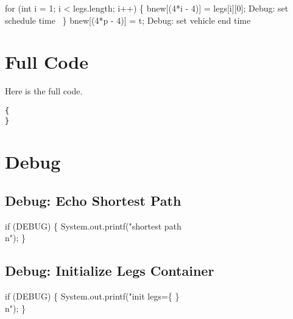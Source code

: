 \nwenddocs{}\endmoddef\nwstartdeflinemarkup{}\nwenddeflinemarkup
for (int i = 1; i < legs.length; i++) \{
  bnew[(4*i - 4)] = legs[i][0];
  \LA{}Debug: set schedule time~{\nwtagstyle{}}\RA{}
\}
bnew[(4*p - 4)] = t;
\LA{}Debug: set vehicle end time~{\nwtagstyle{}}\RA{}
\nwendcode{}\nwdocspar

\section{Full Code}

Here is the full code.

\begin{verbatim}
{
}
\end{verbatim}

\section{Debug}

\subsection{Debug: Echo Shortest Path}

\nwenddocs{}\endmoddef\nwstartdeflinemarkup{}\nwenddeflinemarkup
if (DEBUG) \{
  System.out.printf("shortest path\\n");
\}
\nwendcode{}\nwdocspar

\subsection{Debug: Initialize Legs Container}

\nwenddocs{}\endmoddef\nwstartdeflinemarkup{}\nwenddeflinemarkup
if (DEBUG) \{
  System.out.printf("init legs=\{ \}\\n");
\}
\nwendcode{}\nwdocspar


